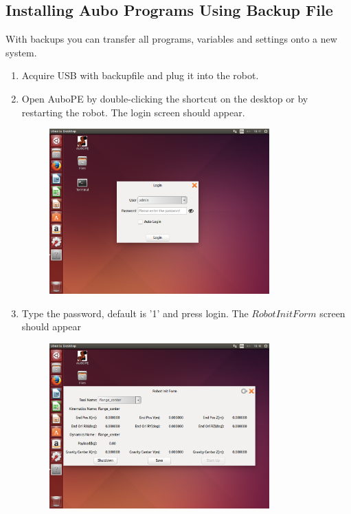 \documentclass{article}
\begin{document}
\subsection{Installing Aubo Programs Using Backup File}
\label{subsec:usingBackup} 
With backups you can transfer all programs, variables and settings onto a new system. 
\begin{enumerate}
\item Acquire USB with backupfile and plug it into the robot.
\item Open AuboPE by double-clicking the shortcut on the desktop or by restarting the robot. The login screen should appear.
\begin{figure}[H]\centering
\includegraphics[width=0.8\textwidth]{../../Images/loginScreen.png}
\end{figure}
\item  Type the password, default is '1' and press login. The $Robot Init Form$ screen should appear
\begin{figure}[H]\centering
\includegraphics[width=0.8\textwidth]{../../Images/RobotInitForm.png}

\end{figure}
\end{enumerate}
\end{document}
